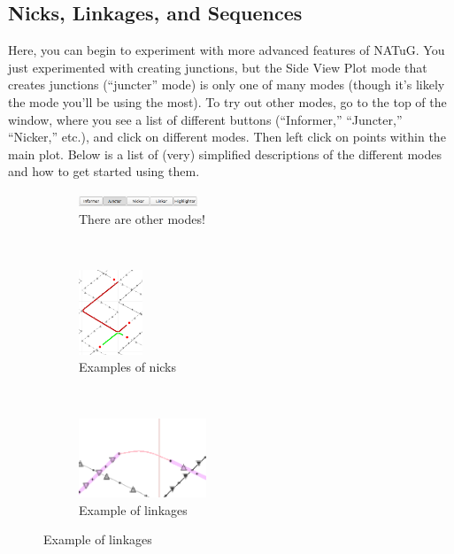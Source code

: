 \documentclass[titlepage]{article}
\begin{document}
\subsection{Nicks, Linkages, and Sequences}
Here, you can begin to experiment with more advanced features of NATuG. You just experimented with creating junctions, but the Side View Plot mode that creates junctions (``juncter'' mode) is only one of many modes (though it's likely the mode you'll be using the most). To try out other modes, go to the top of the window, where you see a list of different buttons (``Informer,'' ``Juncter,'' ``Nicker,'' etc.), and click on different modes. Then left click on points within the main plot. Below is a list of (very) simplified descriptions of the different modes and how to get started using them.

\begin{figure}[h]
	\caption{Advanced NATuG features}
	\centering
	\begin{subfigure}{.3\textwidth}
		\centering
		\includegraphics[width=1.4in]{juncter-activated.png}
		\caption{There are other modes!}
	\end{subfigure}%
	~
	\begin{subfigure}{.3\textwidth}
		\centering
		\includegraphics[height=1in]{nick-examples.png}
		\caption{Examples of nicks}
	\end{subfigure}%
	~
	\begin{subfigure}{.3\textwidth}
		\centering
		\includegraphics[width=1.5in]{linkage-example.png}
		\caption{Example of linkages}
	\end{subfigure}
\end{figure}
\end{document}
